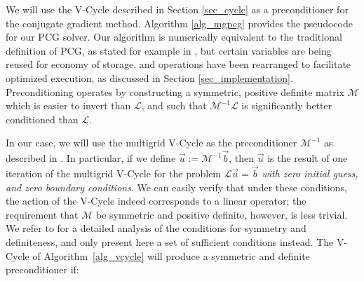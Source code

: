 We will use the V-Cycle described in Section \ref{sec_cycle} as a preconditioner for the conjugate gradient method. Algorithm \ref{alg_mgpcg} provides the pseudocode for our PCG solver. Our
algorithm is numerically equivalent to the traditional definition of PCG, as stated for example in \cite{GolubVanLoan:1989:MC}, but certain variables are being reused for economy of
storage, and operations have been rearranged to facilitate optimized execution, as discussed in Section \ref{sec_implementation}. Preconditioning operates by constructing a symmetric,
positive definite matrix $\mathcal{M}$ which is easier to invert than $\mathcal{L}$, and such that $\mathcal{M}^{-1}\mathcal{L}$ is significantly better conditioned than
$\mathcal{L}$. 


In our case, we will use the multigrid V-Cycle as the preconditioner $\mathcal{M}^{-1}$ as described in \cite{T93}. In particular, if we define $\vec{u}:=\mathcal{M}^{-1}\vec{b}$, then
$\vec{u}$ is the result of one iteration of the multigrid V-Cycle for the problem $\mathcal{L}\vec{u}=\vec{b}$ \emph{with zero initial guess, and zero boundary conditions}. We can easily
verify that under these conditions, the action of the V-Cycle indeed corresponds to a linear operator; the requirement that $\mathcal{M}$ be symmetric and positive definite, however, is
less trivial. We refer to \cite{T93} for a detailed analysis of the conditions for symmetry and definiteness, and only present here a set of sufficient conditions instead. The V-Cycle of
Algorithm~\ref{alg_vcycle} will produce a symmetric and definite preconditioner if:

